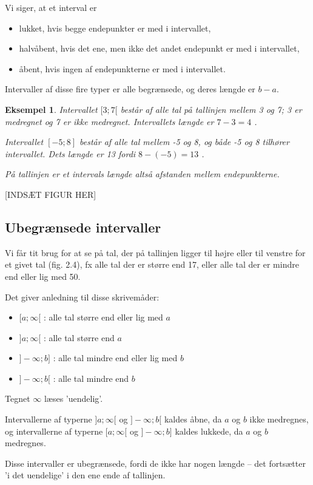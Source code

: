 \documentclass[12pt,oneside,a4paper]{article}
\newtheorem{eks}[thm]{Eksempel}
\begin{document}
Vi siger, at et interval er
\begin{itemize}
    \item lukket, hvis begge endepunkter er med i intervallet,
    \item halvåbent, hvis det ene, men ikke det andet endepunkt er med i intervallet,
    \item åbent, hvis ingen af endepunkterne er med i intervallet.
\end{itemize}
Intervaller af disse fire typer er alle begrænsede, og deres længde er $b-a$.

\begin{eks}
Intervallet $[3;7[$ består af alle tal på tallinjen mellem 3 og 7; 3 er
medregnet og 7 er ikke medregnet. Intervallets længde er $7-3 = 4$ .

Intervallet $[-5;8]$ består af alle tal mellem -5 og 8, og både -5 og 8
tilhører intervallet. Dets længde er 13 fordi $8 - (-5) = 13$ .

På tallinjen er et intervals længde altså afstanden mellem endepunkterne.
\end{eks}
[INDSÆT FIGUR HER]

\subsection{Ubegrænsede intervaller}
Vi får tit brug for at se på tal, der på tallinjen ligger til højre eller til
venstre for et givet tal (fig. 2.4), fx alle tal der er større end 17, eller
alle tal der er mindre end eller lig med 50.

Det giver anledning til disse skrivemåder:

\begin{itemize}
    \item $[a;\infty[$  : alle tal større end eller lig med $a$
    \item $]a;\infty[$  : alle tal større end $a$
    \item $]-\infty;b]$ : alle tal mindre end eller lig med $b$
    \item $]-\infty;b[$ : alle tal mindre end $b$
\end{itemize}
Tegnet $\infty$ læses ’uendelig’.

Intervallerne af typerne $]a;\infty [$ og $]-\infty ;b[$ kaldes åbne, da $a$ og $b$
ikke medregnes, og intervallerne af typerne $[a;\infty [$ og $]-\infty ;b]$
kaldes lukkede, da $a$ og $b$ medregnes.

Disse intervaller er ubegrænsede, fordi de ikke har nogen længde – det
fortsætter ’i det uendelige’ i den ene ende af tallinjen.
\end{document}
